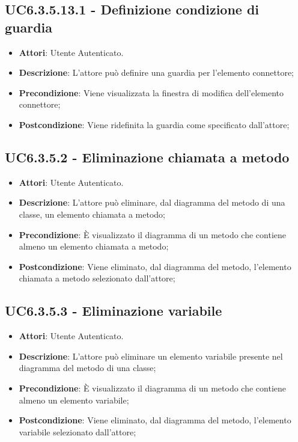 \subsection{UC6.3.5.13.1 - Definizione condizione di guardia} 
\label{ssec:UC6.3.5.13.1} 
\begin{itemize} 
\item \textbf{Attori}: Utente Autenticato.
\item \textbf{Descrizione}: L'attore può definire una guardia per l'elemento connettore;
\item \textbf{Precondizione}: Viene visualizzata la finestra di modifica dell'elemento connettore;
\item \textbf{Postcondizione}: Viene ridefinita la guardia come specificato dall'attore;
\end{itemize} 
\subsection{UC6.3.5.2 - Eliminazione chiamata a metodo} 
\label{ssec:UC6.3.5.2} 
\begin{itemize} 
\item \textbf{Attori}: Utente Autenticato.
\item \textbf{Descrizione}: L'attore può eliminare, dal diagramma del metodo di una classe, un elemento chiamata a metodo;
\item \textbf{Precondizione}: È visualizzato il diagramma di un metodo che contiene almeno un elemento chiamata a metodo;
\item \textbf{Postcondizione}: Viene eliminato, dal diagramma del metodo,  l'elemento chiamata a metodo selezionato dall'attore;
\end{itemize} 
\subsection{UC6.3.5.3 - Eliminazione variabile} 
\label{ssec:UC6.3.5.3} 
\begin{itemize} 
\item \textbf{Attori}: Utente Autenticato.
\item \textbf{Descrizione}: L'attore può eliminare un elemento variabile presente nel diagramma del metodo di una classe;
\item \textbf{Precondizione}: È visualizzato il diagramma di un metodo che contiene almeno un elemento variabile;
\item \textbf{Postcondizione}: Viene eliminato, dal diagramma del metodo,  l'elemento variabile selezionato dall'attore;
\end{itemize} 
